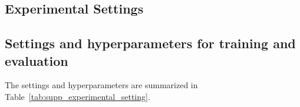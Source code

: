 \documentclass{article}
\theoremstyle{plain}
\theoremstyle{definition}
\theoremstyle{remark}
\begin{document}
\begin{appendices}




        
    




\clearpage
\newpage
\section{Experimental Settings}

\subsection{Settings and hyperparameters for training and evaluation}
\label{sec:setting_and_hyperparams}

The settings and hyperparameters are summarized in Table~\ref{tab:supp_experimental_setting}.


\end{appendices}
\end{document}
